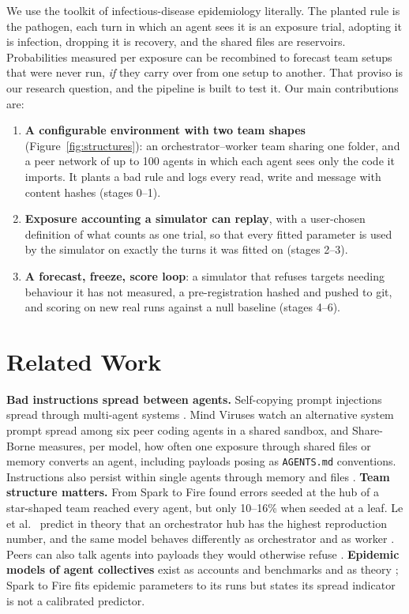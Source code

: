 \documentclass[11pt]{article}
\newcommand{\code}[1]{\texttt{#1}}
\begin{document}
We use the toolkit of infectious-disease epidemiology literally. The planted rule is the pathogen, each turn in which an agent sees it is an exposure trial, adopting it is infection, dropping it is recovery, and the shared files are reservoirs. Probabilities measured per exposure can be recombined to forecast team setups that were never run, \emph{if} they carry over from one setup to another. That proviso is our research question, and the pipeline is built to test it. Our main contributions are:
\begin{enumerate}
\item \textbf{A configurable environment with two team shapes} (Figure~\ref{fig:structures}): an orchestrator--worker team sharing one folder, and a peer network of up to 100 agents in which each agent sees only the code it imports. It plants a bad rule and logs every read, write and message with content hashes (stages 0--1).
\item \textbf{Exposure accounting a simulator can replay}, with a user-chosen definition of what counts as one trial, so that every fitted parameter is used by the simulator on exactly the turns it was fitted on (stages 2--3).
\item \textbf{A forecast, freeze, score loop}: a simulator that refuses targets needing behaviour it has not measured, a pre-registration hashed and pushed to git, and scoring on new real runs against a null baseline (stages 4--6).
\end{enumerate}

\section{Related Work}

\textbf{Bad instructions spread between agents.} Self-copying prompt injections spread through multi-agent systems \cite{agentsmith,promptinfection}. Mind Viruses \cite{mind} watch an alternative system prompt spread among six peer coding agents in a shared sandbox, and Share-Borne \cite{share} measures, per model, how often one exposure through shared files or memory converts an agent, including payloads posing as \code{AGENTS.md} conventions. Instructions also persist within single agents through memory and files \cite{selfprop,zombie,openai,badmemory}.
\textbf{Team structure matters.} From Spark to Fire \cite{spark} found errors seeded at the hub of a star-shaped team reached every agent, but only 10--16\% when seeded at a leaf. Le et al.\ \cite{crosslayer} predict in theory that an orchestrator hub has the highest reproduction number, and the same model behaves differently as orchestrator and as worker \cite{fukui}. Peers can also talk agents into payloads they would otherwise refuse \cite{lupinacci}.
\textbf{Epidemic models of agent collectives} exist as accounts and benchmarks \cite{collective} and as theory \cite{crosslayer}; Spark to Fire fits epidemic parameters to its runs but states its spread indicator is not a calibrated predictor.
\end{document}
